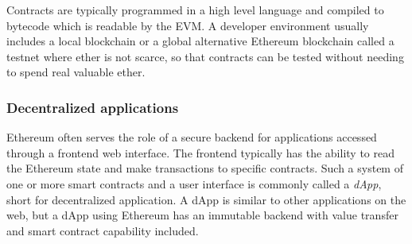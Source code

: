 Contracts are typically programmed in a high level language and compiled to bytecode which is readable by the EVM. A developer environment usually includes a local blockchain or a global alternative Ethereum blockchain called a testnet where ether is not scarce, so that contracts can be tested without needing to spend real valuable ether.

\subsubsection{Decentralized applications}
Ethereum often serves the role of a secure backend for applications accessed through a frontend web interface. The frontend typically has the ability to read the Ethereum state and make transactions to specific contracts. Such a system of one or more smart contracts and a user interface is commonly called a \emph{dApp}, short for decentralized application. A dApp is similar to other applications on the web, but a dApp using Ethereum has an immutable backend with value transfer and smart contract capability included.

